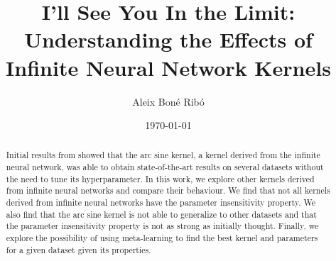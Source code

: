 \renewcommand\and{\\[\baselineskip]}

\title{I'll See You In the Limit:
 Understanding the Effects of Infinite Neural Network Kernels}
\author{Aleix Boné Ribó}
\date{\today}



\cleardoublepage

\cleardoublepage




\begin{abstract}
    Initial results from \textcite{frenayParameterinsensitiveKernelExtreme2011}
    showed that the arc sine kernel, a kernel derived from the infinite neural
    network, was able to obtain state-of-the-art results on several datasets
    without the need to tune its hyperparameter. In this work, we explore other
    kernels derived from infinite neural networks and compare their behaviour.
    We find that not all kernels derived from infinite neural networks have the
    parameter insensitivity property. We also find that the arc sine kernel is
    not able to generalize to other datasets and that the parameter
    insensitivity property is not as strong as initially thought. Finally, we
    explore the possibility of using meta-learning to find the best kernel and
    parameters for a given dataset given its properties.
\end{abstract}



